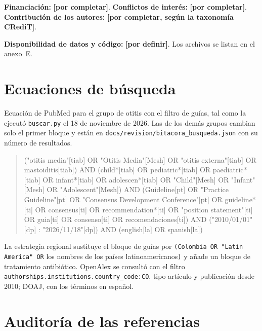 \documentclass[11pt,a4paper]{article}
\newcommand{\pendiente}[1]{\textcolor{rojo}{\textbf{[#1]}}}
\newcommand{\codigo}[1]{\texttt{\small #1}}
\begin{document}
\noindent\textbf{Financiación:} \pendiente{por completar}. \textbf{Conflictos de interés:} \pendiente{por completar}. \textbf{Contribución de los autores:} \pendiente{por completar, según la taxonomía CRediT}.

\noindent\textbf{Disponibilidad de datos y código:} \pendiente{por definir}. Los archivos se listan en el anexo~E.




\clearpage
\appendix
\renewcommand{\thesection}{\Alph{section}}
\section{Ecuaciones de búsqueda}

Ecuación de PubMed para el grupo de otitis con el filtro de guías, tal como la ejecutó \codigo{buscar.py} el 18 de noviembre de 2026. Las de los demás grupos cambian solo el primer bloque y están en \codigo{docs/revision/bitacora\_busqueda.json} con su número de resultados.

\begin{quote}\footnotesize\ttfamily\raggedright
("otitis media"[tiab] OR "Otitis Media"[Mesh] OR "otitis externa"[tiab] OR mastoiditis[tiab]) AND (child*[tiab] OR pediatric*[tiab] OR paediatric*[tiab] OR infant*[tiab] OR adolescen*[tiab] OR "Child"[Mesh] OR "Infant"[Mesh] OR "Adolescent"[Mesh]) AND (Guideline[pt] OR "Practice Guideline"[pt] OR "Consensus Development Conference"[pt] OR guideline*[ti] OR consensus[ti] OR recommendation*[ti] OR "position statement"[ti] OR guia[ti] OR consenso[ti] OR recomendaciones[ti]) AND ("2010/01/01"[dp] : "2026/11/18"[dp]) AND (english[la] OR spanish[la])
\end{quote}

La estrategia regional sustituye el bloque de guías por \texttt{(Colombia OR "Latin America" OR} los nombres de los países latinoamericanos\texttt{)} y añade un bloque de tratamiento antibiótico. OpenAlex se consultó con el filtro \texttt{authorships.institutions.country\_code:CO}, tipo artículo y publicación desde 2010; DOAJ, con los términos en español.

\section{Auditoría de las referencias}
\end{document}
